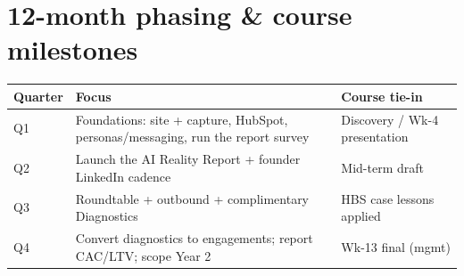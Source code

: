 \documentclass[11pt]{article}
\begin{document}
\section{12-month phasing \& course milestones}
\begin{center}
\renewcommand{\arraystretch}{1.2}\small
\begin{tabular}{p{1.5cm} p{7.6cm} p{3.4cm}}
\toprule
\textbf{Quarter} & \textbf{Focus} & \textbf{Course tie-in} \\
\midrule
Q1 & Foundations: site + capture, HubSpot, personas/messaging, run the report survey & Discovery / Wk-4 presentation \\
Q2 & Launch the AI Reality Report + founder LinkedIn cadence & Mid-term draft \\
Q3 & Roundtable + outbound + complimentary Diagnostics & HBS case lessons applied \\
Q4 & Convert diagnostics to engagements; report CAC/LTV; scope Year 2 & Wk-13 final (mgmt) \\
\bottomrule
\end{tabular}
\end{center}

\end{document}
